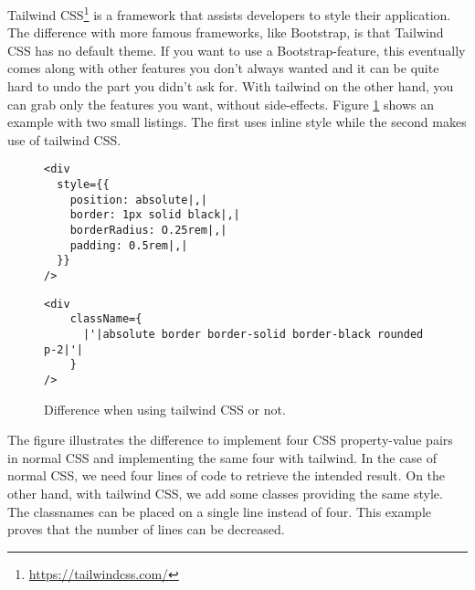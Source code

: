 Tailwind CSS\footnote{\url{https://tailwindcss.com/}} is a framework that assists developers to style their application. The difference with more famous frameworks, like Bootstrap, is that Tailwind CSS has no default theme. If you want to use a Bootstrap-feature, this eventually comes along with other features you don't always wanted and it can be quite hard to undo the part you didn't ask for. With tailwind on the other hand, you can grab only the features you want, without side-effects. Figure \ref{fig:examplecode-tailwindcss} shows an example with two small listings. The first uses inline style while the second makes use of tailwind CSS.\\

\begin{figure}[H]
	\begin{minipage}[b]{0.5\textwidth}
 		\centering
  		\begin{verbatim}
<div
  style={{
    position: absolute|,|
    border: 1px solid black|,|
    borderRadius: O.25rem|,|
    padding: 0.5rem|,|
  }}
/>
		\end{verbatim}
		\label{lst:no-tailwind}
	\end{minipage}
 	\begin{minipage}[b]{0.5\textwidth}
  		\centering
		\begin{verbatim}
<div
    className={
      |'|absolute border border-solid border-black rounded p-2|'|
    }
/>
		\end{verbatim}
		\label{lst:tailwind}
 	\end{minipage}
	\caption{Difference when using tailwind CSS or not.}
	\label{fig:examplecode-tailwindcss}
\end{figure}

The figure illustrates the difference to implement four CSS property-value pairs in normal CSS and implementing the same four with tailwind. In the case of normal CSS, we need four lines of code to retrieve the intended result. On the other hand, with tailwind CSS, we add some classes providing the same style. The classnames can be placed on a single line instead of four. This example proves that the number of lines can be decreased.





